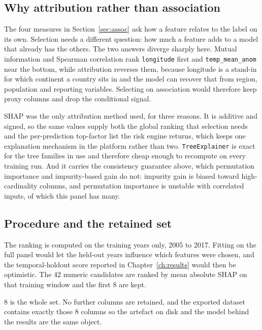 \documentclass[10pt,openany]{report}
\begin{document}
\subsection{Why attribution rather than association}

The four measures in Section~\ref{sec:assoc} ask how a feature relates to the label on its own.
Selection needs a different question: how much a feature adds to a model that already has the others.
The two answers diverge sharply here. Mutual information and Spearman correlation rank
\texttt{longitude} first and \texttt{temp\_mean\_anom} near the bottom, while attribution reverses
them, because longitude is a stand-in for which continent a country sits in and the model can recover
that from region, population and reporting variables. Selecting on association would therefore keep
proxy columns and drop the conditional signal.

SHAP was the only attribution method used, for three reasons. It is additive and signed, so the same
values supply both the global ranking that selection needs and the per-prediction top-factor list the
risk engine returns, which keeps one explanation mechanism in the platform rather than two.
\texttt{TreeExplainer} is exact for the tree families in use and therefore cheap enough to recompute
on every training run. And it carries the consistency guarantee above, which permutation importance
and impurity-based gain do not: impurity gain is biased toward high-cardinality columns, and
permutation importance is unstable with correlated inputs, of which this panel has many.

\subsection{Procedure and the retained set}

The ranking is computed on the training years only, 2005 to 2017. Fitting on the full panel
would let the held-out years influence which features were chosen, and the temporal-holdout score
reported in Chapter~\ref{ch:results} would then be optimistic. The 42 numeric candidates are
ranked by mean absolute SHAP on that training window and the first 8 are kept.

8 is the whole set. No further columns are retained, and the exported dataset contains exactly
those 8 columns so the artefact on disk and the model behind the results are the same object.
\end{document}
